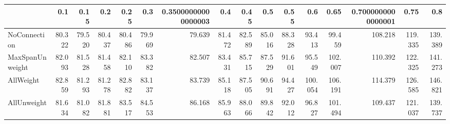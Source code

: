 \begin{tabular}{lrrrrrrrrrrrrrrr}
\toprule
{} &    0.1 &   0.15 &    0.2 &   0.25 &    0.3 & 0.35000000000000003 &    0.4 &   0.45 &    0.5 &   0.55 &     0.6 &    0.65 & 0.7000000000000001 &    0.75 &     0.8 \\
\midrule
NoConnection    & 80.322 & 79.520 & 80.437 & 80.486 & 79.969 &              79.639 & 81.472 & 82.589 & 85.016 & 88.328 &  93.413 &  99.459 &            108.218 & 119.335 & 139.389 \\
MaxSpanUnweight & 82.093 & 81.528 & 81.458 & 82.110 & 83.382 &              82.507 & 83.431 & 85.715 & 87.529 & 91.601 &  95.549 & 102.007 &            110.392 & 122.325 & 141.273 \\
AllWeight       & 82.859 & 81.293 & 81.278 & 82.882 & 83.137 &              83.739 & 85.118 & 87.505 & 90.691 & 94.427 & 100.054 & 106.191 &            114.379 & 126.585 & 146.821 \\
AllUnweight     & 81.634 & 81.082 & 81.881 & 83.517 & 84.553 &              86.168 & 85.963 & 88.066 & 89.842 & 92.012 &  96.827 & 101.494 &            109.437 & 121.037 & 139.737 \\
\bottomrule
\end{tabular}
